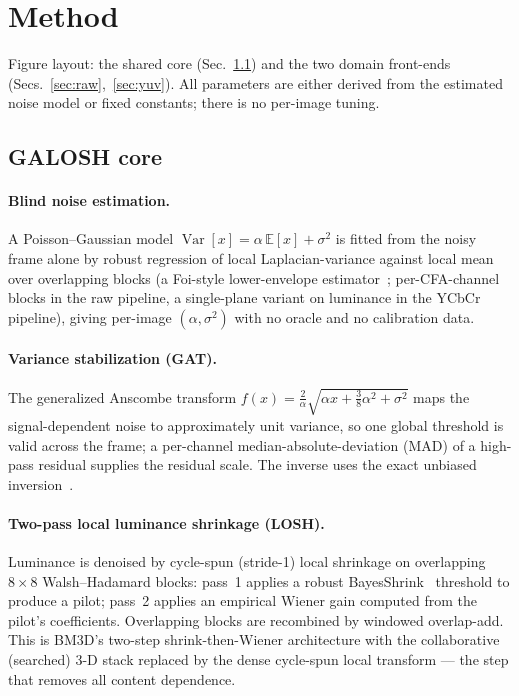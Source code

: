 \documentclass[10pt,twocolumn]{article}
\begin{document}
\section{Method}\label{sec:method}
Figure layout: the shared core (Sec.~\ref{sec:core}) and the two domain
front-ends (Secs.~\ref{sec:raw},~\ref{sec:yuv}). All parameters are either
derived from the estimated noise model or fixed constants; there is no
per-image tuning.

\subsection{GALOSH core}\label{sec:core}
\paragraph{Blind noise estimation.}
A Poisson--Gaussian model $\operatorname{Var}[x]=\alpha\,\mathbb{E}[x]+\sigma^2$
is fitted from the noisy frame alone by robust regression of local
Laplacian-variance against local mean over overlapping blocks (a
Foi-style lower-envelope estimator~\cite{foi}; per-CFA-channel blocks in
the raw pipeline, a single-plane variant on luminance in the YCbCr
pipeline), giving per-image $(\alpha,\sigma^2)$ with no
oracle and no calibration data.

\paragraph{Variance stabilization (GAT).}
The generalized Anscombe transform
$f(x)=\tfrac{2}{\alpha}\sqrt{\alpha x+\tfrac38\alpha^2+\sigma^2}$ maps the
signal-dependent noise to approximately unit variance, so one global threshold
is valid across the frame; a per-channel median-absolute-deviation (MAD) of a
high-pass residual supplies the residual scale. The inverse uses the exact
unbiased inversion~\cite{makitalo}.

\paragraph{Two-pass local luminance shrinkage (LOSH).}
Luminance is denoised by cycle-spun (stride-1) local shrinkage on overlapping
$8{\times}8$ Walsh--Hadamard blocks: pass~1 applies a robust
BayesShrink~\cite{bayesshrink} threshold to produce a pilot; pass~2 applies an
empirical Wiener gain computed from the pilot's coefficients. Overlapping
blocks are recombined by windowed overlap-add. This is BM3D's two-step
shrink-then-Wiener architecture with the collaborative (searched) 3-D stack
replaced by the dense cycle-spun local transform --- the step that removes all
content dependence.
\end{document}
